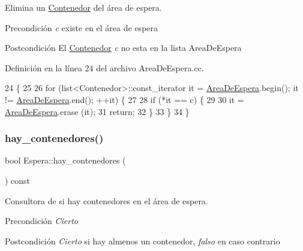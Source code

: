 Elimina un \hyperlink{class_contenedor}{Contenedor} del área de espera. 

\begin{DoxyPrecond}{Precondición}
{\itshape c} existe en el área de espera 
\end{DoxyPrecond}
\begin{DoxyPostcond}{Postcondición}
El \hyperlink{class_contenedor}{Contenedor} {\itshape c} no esta en la lista Area\+De\+Espera 
\end{DoxyPostcond}


Definición en la línea 24 del archivo Area\+De\+Espera.\+cc.


\begin{DoxyCode}
24                                                      \{
25     
26     \textcolor{keywordflow}{for} (list<Contenedor>::const\_iterator it = \hyperlink{class_espera_adafca5e22c5bc21e517b363144fc6b18}{AreaDeEspera}.begin(); it != 
      \hyperlink{class_espera_adafca5e22c5bc21e517b363144fc6b18}{AreaDeEspera}.end(); ++it) \{
27         
28         \textcolor{keywordflow}{if} (*it == c) \{
29             
30             it = \hyperlink{class_espera_adafca5e22c5bc21e517b363144fc6b18}{AreaDeEspera}.erase (it);
31             \textcolor{keywordflow}{return};
32         \}
33     \}
34 \}
\end{DoxyCode}
\mbox{\label{class_espera_ae97d5ed76fdcf057835b51a87deaffb9}} 
\subsubsection{\texorpdfstring{hay\+\_\+contenedores()}{hay\_contenedores()}}
{\footnotesize\ttfamily bool Espera\+::hay\+\_\+contenedores (\begin{DoxyParamCaption}{ }\end{DoxyParamCaption}) const}



Consultora de si hay contenedores en el área de espera. 

\begin{DoxyPrecond}{Precondición}
{\itshape Cierto} 
\end{DoxyPrecond}
\begin{DoxyPostcond}{Postcondición}
{\itshape Cierto} si hay almenos un contenedor, {\itshape falso} en caso contrario 
\end{DoxyPostcond}


